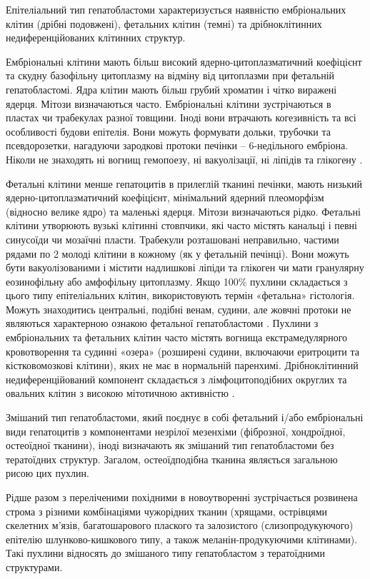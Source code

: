 Епітеліальний тип гепатобластоми характеризується наявністю ембріональних клітин (дрібні подовжені), фетальних клітин (темні) та дрібноклітинних недиференційованих клітинних структур. 

Ембріональні  клітини мають більш високий ядерно-цитоплазматичний коефіцієнт та скудну базофільну цитоплазму на відміну від цитоплазми при фетальній гепатобластомі. Ядра клітин мають більш грубий хроматин і чітко виражені ядерця. Мітози визначаються часто. Ембріональні клітини зустрічаються в пластах чи трабекулах разної товщини. Іноді  вони втрачають когезивність та всі особливості будови епітелія. Вони можуть формувати дольки, трубочки та псевдорозетки, нагадуючи зародкові протоки печінки – 6-недільного ембріона. Ніколи не знаходять ні вогнищ гемопоезу, ні вакуолізації, ні ліпідів та глікогену \cite{pmid20922397}.

Фетальні клітини менше гепатоцитів в прилеглій тканині печінки, мають низький ядерно-цитоплазматичний коефіцієнт, мінімальний ядерний плеоморфізм (відносно велике ядро) та маленькі ядерця. Мітози визначаються рідко. Фетальні клітини утворюють вузькі клітинні стовпчики, які часто містять канальці і певні  синусоїди чи мозаїчні пласти. Трабекули розташовані неправильно, частими рядами по 2 молоді клітини в кожному (як у фетальній печінці). Вони можуть бути вакуолізованими і містити надлишкові ліпіди та глікоген чи мати гранулярну еозинофільну або амфофільну цитоплазму. Якщо 100\% пухлини складається з цього типу епітеліальних клітин, використовують термін «фетальна» гістологія. Можуть знаходитись центральні, подібні венам, судини, але жовчні протоки не являються характерною ознакою фетальної гепатобластоми \cite{pmid18970927}.
Пухлини з ембріональних та фетальних клітин часто містять вогнища екстрамедулярного кровотворення та судинні «озера» (розширені судини, включаючи еритроцити та кістковомозкові клітини), яких не має в нормальній паренхимі.
Дрібноклітинний недиференційований компонент складається з лімфоцитоподібних округлих та овальних клітин з високою мітотичною активністю \cite{pmid2544067}.

Змішаний тип гепатобластоми, який  поєднує в собі фетальний  і/або ембріональні види гепатоцитів з компонентами незрілої мезенхіми    (фіброзної, хондроїдної, остеоїдної тканини), іноді визначають як змішаний тип гепатобластоми без тератоїдних структур. Загалом, остеоїдподібна тканина являється загальною рисою цих пухлин.

Рідше разом з переліченими похідними в новоутворенні зустрічається розвинена строма з різними комбінаціями  чужорідних  тканин (хрящами, острівцями скелетних м’язів, багатошарового плаского та залозистого (слизопродукуючого) епітелію шлунково-кишкового типу, а також меланін-продукуючими клітинами). Такі пухлини відносять до змішаного типу гепатобластом з тератоїдними структурами.


